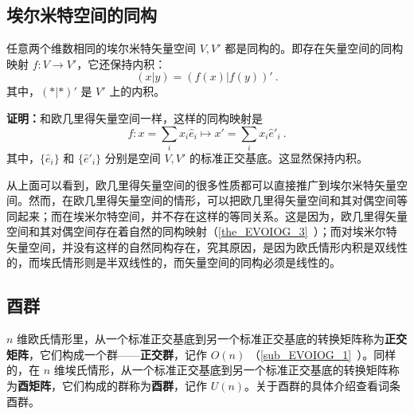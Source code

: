 \subsection{埃尔米特空间的同构}
\begin{theorem}{}
任意两个维数相同的埃尔米特矢量空间 $V,V'$ 都是同构的。即存在矢量空间的同构映射 $f:V\rightarrow V'$，它还保持内积：
\begin{equation}
(  x|  y)=(f(  x)|f(  y))'~.
\end{equation}
其中，$(*|*)'$ 是 $V'$ 上的内积。
\end{theorem}
\textbf{证明：}和欧几里得矢量空间一样，这样的同构映射是
\begin{equation}
f:  x=\sum_{i}x_i  \hat e_i\mapsto  x'=\sum_i x_i \hat e'_i~.
\end{equation}
其中，$\{ \hat e_i\}$ 和 $\{ \hat e'_i\}$ 分别是空间 $V,V'$ 的标准正交基底。这显然保持内积。

从上面可以看到，欧几里得矢量空间的很多性质都可以直接推广到埃尔米特矢量空间。然而，在欧几里得矢量空间的情形，可以把欧几里得矢量空间和其对偶空间等同起来；而在埃米尔特空间，并不存在这样的等同关系。这是因为，欧几里得矢量空间和其对偶空间存在着自然的同构映射（\autoref{the_EVOIOG_3}~）；而对埃米尔特矢量空间，并没有这样的自然同构存在，究其原因，是因为欧氏情形内积是双线性的，而埃氏情形则是半双线性的，而矢量空间的同构必须是线性的。
\subsection{酉群}
 $n$ 维欧氏情形里，从一个标准正交基底到另一个标准正交基底的转换矩阵称为\textbf{正交矩阵}，它们构成一个群——\textbf{正交群}，记作 $O(n)$ （\autoref{sub_EVOIOG_1}~）。同样的，在 $n$ 维埃氏情形，从一个标准正交基底到另一个标准正交基底的转换矩阵称为\textbf{酉矩阵}，它们构成的群称为\textbf{酉群}，记作 $U(n)$。关于酉群的具体介绍查看词条酉群。
